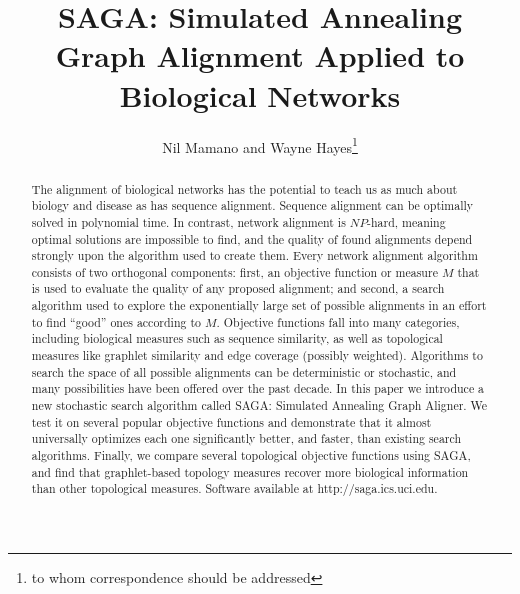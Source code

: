 \documentclass{bioinfo}
\begin{document}

\title[SAGA: Simulated Annealing Graph Alignment Applied to Biological Networks]{SAGA: Simulated Annealing Graph Alignment Applied to Biological Networks}
\author[N.Mamano and W.Hayes]{Nil Mamano and Wayne Hayes\footnote{to whom correspondence should be addressed}}
\address{Department of Computer Science, University of California, Irvine CA 92697-3435, USA
}



\maketitle

\begin{abstract}
The alignment of biological networks has the potential to teach us as much about biology and disease as has sequence alignment.
Sequence alignment can be optimally solved in polynomial time. In contrast, network alignment is $NP$-hard,
meaning optimal solutions are impossible to find, and the quality of found alignments depend strongly upon the algorithm used
to create them.
Every network alignment algorithm consists of two orthogonal components: first, an objective function or measure $M$ that is used to evaluate the quality of any proposed alignment; and second, a search algorithm used to explore the exponentially large set of possible alignments in an effort to find ``good'' ones according to $M$.  Objective functions fall into many categories, including biological measures such as sequence similarity, as well as topological measures like graphlet similarity and edge coverage (possibly weighted). Algorithms to search the space of all possible alignments can be deterministic or stochastic, and many possibilities have been offered over the past decade. In this paper we introduce a new stochastic search algorithm called SAGA: Simulated Annealing Graph Aligner. We test it on several popular objective functions and demonstrate that it almost universally optimizes each one significantly better, and faster, than existing search algorithms.
Finally, we compare several topological objective functions using SAGA, and find that graphlet-based topology measures recover more biological information than other topological measures.
Software available at http://saga.ics.uci.edu.

\end{abstract}
\end{document}
